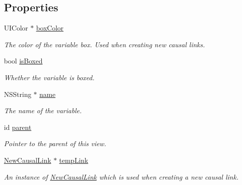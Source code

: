 \subsection*{Properties}
\begin{DoxyCompactItemize}
\item 
\hypertarget{interface_variable_view_adffdfe6d544463a4ec27f62889403aa4}{U\-I\-Color $\ast$ \hyperlink{interface_variable_view_adffdfe6d544463a4ec27f62889403aa4}{box\-Color}}\label{interface_variable_view_adffdfe6d544463a4ec27f62889403aa4}

\begin{DoxyCompactList}\small\item\em The color of the variable box. Used when creating new causal links. \end{DoxyCompactList}\item 
\hypertarget{interface_variable_view_a8eccf963342a358cf524a44e0696771e}{bool \hyperlink{interface_variable_view_a8eccf963342a358cf524a44e0696771e}{is\-Boxed}}\label{interface_variable_view_a8eccf963342a358cf524a44e0696771e}

\begin{DoxyCompactList}\small\item\em Whether the variable is boxed. \end{DoxyCompactList}\item 
\hypertarget{interface_variable_view_a4b93d352d2fca75b34e1b5a50e03f587}{N\-S\-String $\ast$ \hyperlink{interface_variable_view_a4b93d352d2fca75b34e1b5a50e03f587}{name}}\label{interface_variable_view_a4b93d352d2fca75b34e1b5a50e03f587}

\begin{DoxyCompactList}\small\item\em The name of the variable. \end{DoxyCompactList}\item 
\hypertarget{interface_variable_view_a4376b99467d16ed71554a4a6ddd4ae0a}{id \hyperlink{interface_variable_view_a4376b99467d16ed71554a4a6ddd4ae0a}{parent}}\label{interface_variable_view_a4376b99467d16ed71554a4a6ddd4ae0a}

\begin{DoxyCompactList}\small\item\em Pointer to the parent of this view. \end{DoxyCompactList}\item 
\hypertarget{interface_variable_view_ab9596dece716623542ebe46b3abda05b}{\hyperlink{interface_new_causal_link}{New\-Causal\-Link} $\ast$ \hyperlink{interface_variable_view_ab9596dece716623542ebe46b3abda05b}{temp\-Link}}\label{interface_variable_view_ab9596dece716623542ebe46b3abda05b}

\begin{DoxyCompactList}\small\item\em An instance of \hyperlink{interface_new_causal_link}{New\-Causal\-Link} which is used when creating a new causal link. \end{DoxyCompactList}\end{DoxyCompactItemize}


